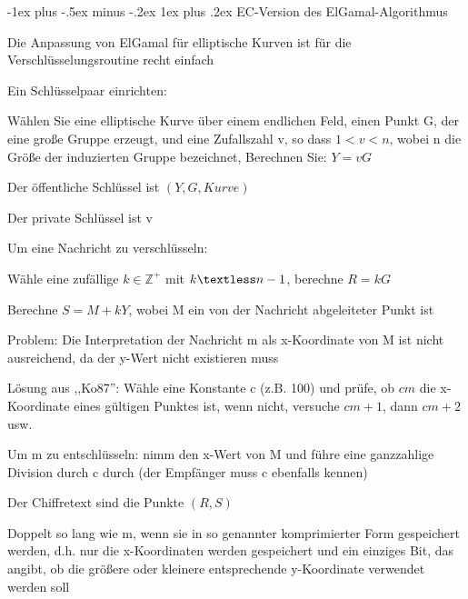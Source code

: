 \documentclass[a4paper]{article}
\makeatletter
\renewcommand{\subsubsection}{\@startsection{subsubsection}{3}{0mm}%
 {-1ex plus -.5ex minus -.2ex}%
 {1ex plus .2ex}%
 {\normalfont\small\bfseries}}
\makeatother
\begin{document}
\begin{multicols}{3}
      \subsubsection{EC-Version des ElGamal-Algorithmus}
      \begin{itemize*}
            \item Die Anpassung von ElGamal für elliptische Kurven ist für die Verschlüsselungsroutine recht einfach
            \item Ein Schlüsselpaar einrichten:
            \begin{itemize*}
                  \item Wählen Sie eine elliptische Kurve über einem endlichen Feld, einen Punkt G, der eine große Gruppe erzeugt, und eine Zufallszahl v, so dass $1 < v < n$, wobei n die Größe der induzierten Gruppe bezeichnet, Berechnen Sie: $Y = vG$
                  \item Der öffentliche Schlüssel ist $(Y,G,Kurve)$
                  \item Der private Schlüssel ist v
            \end{itemize*}
            \item Um eine Nachricht zu verschlüsseln:
            \begin{itemize*}
                  \item Wähle eine zufällige $k\in\mathbb{Z}^+$ mit $k\textless n-1$, berechne $R=kG$
                  \item Berechne $S=M+kY$, wobei M ein von der Nachricht abgeleiteter Punkt ist
                  \begin{itemize*}
                        \item Problem: Die Interpretation der Nachricht m als x-Koordinate von M ist nicht ausreichend, da der y-Wert nicht existieren muss
                        \item Lösung aus ,,Ko87'': Wähle eine Konstante c (z.B. 100) und prüfe, ob $cm$ die x-Koordinate eines gültigen Punktes ist, wenn nicht, versuche $cm+1$, dann $cm+2$ usw.
                        \item Um m zu entschlüsseln: nimm den x-Wert von M und führe eine ganzzahlige Division durch c durch (der Empfänger muss c ebenfalls kennen)
                  \end{itemize*}
                  \item Der Chiffretext sind die Punkte $(R,S)$
                  \item Doppelt so lang wie m, wenn sie in so genannter komprimierter Form gespeichert werden, d.h. nur die x-Koordinaten werden gespeichert und ein einziges Bit, das angibt, ob die größere oder kleinere entsprechende y-Koordinate verwendet werden soll

\end{itemize*}
\end{itemize*}
\end{multicols}
\end{document}
